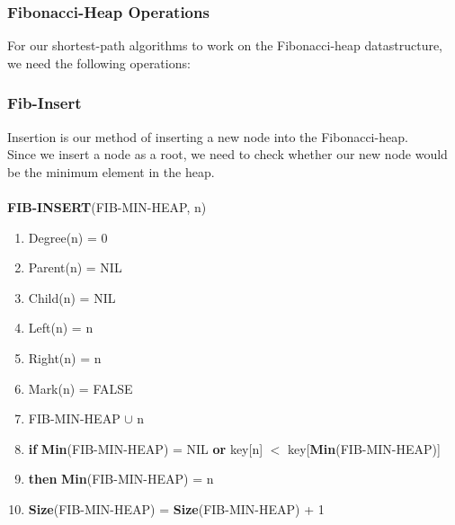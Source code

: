 \documentclass[11pt]{article}
\begin{document}
\subsubsection{Fibonacci-Heap Operations}
For our shortest-path algorithms to work on the Fibonacci-heap datastructure, we need the following operations:
\subsubsection{Fib-Insert}
Insertion is our method of inserting a new node into the Fibonacci-heap.\\
Since we insert a node as a root, we need to check whether our new node would be the minimum element in the heap.\\\\
\textbf{FIB-INSERT}(FIB-MIN-HEAP, n)
\begin{enumerate}
\setlength\itemsep{0em}
\item Degree(n) = 0
\item Parent(n) = NIL
\item Child(n) = NIL
\item Left(n) = n
\item Right(n) = n
\item Mark(n) = FALSE
\item FIB-MIN-HEAP $\cup$ n
\item \textbf{if } \textbf{Min}(FIB-MIN-HEAP) = NIL \textbf{or } key[n] $<$ key[\textbf{Min}(FIB-MIN-HEAP)]
\item \tab \textbf{then } \textbf{Min}(FIB-MIN-HEAP) = n
\item \textbf{Size}(FIB-MIN-HEAP) = \textbf{Size}(FIB-MIN-HEAP) + 1
\end{enumerate}
\end{document}
